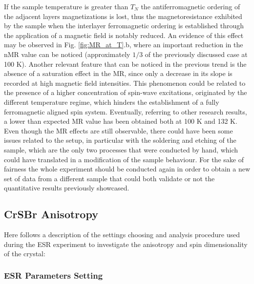 \documentclass[journal]{IEEEtran}
\begin{document}
If the sample temperature is greater than $T_N$ the antiferromagnetic ordering of the adjacent layers magnetizations is lost, thus the magnetoresistance exhibited by the sample when the interlayer ferromagnetic ordering is established through the application of a magnetic field is notably reduced. An evidence of this effect may be observed in Fig. \ref{fig:MR_at_T}.b, where an important reduction in the nMR value can be noticed (approximately $1/3$ of the previously discussed case at 100 K). Another relevant feature that can be noticed in the previous trend is the absence of a saturation effect in the MR, since only a decrease in its slope is recorded at high magnetic field intensities. This phenomenon could be related to the presence of a higher concentration of spin-wave excitations, originated by the different temperature regime, which hinders the establishment of a fully ferromagnetic aligned spin system. Eventually, referring to other research results, a lower than expected MR value has been obtained both at 100 K and 132 K. Even though the MR effects are still observable, there could have been some issues related to the setup, in particular with the soldering and etching of the sample, which are the only two processes that were conducted by hand, which could have translated in a modification of the sample behaviour. For the sake of fairness the whole experiment should be conducted again in order to obtain a new set of data from a different sample that could both validate or not the quantitative results previously showcased.

\subsection{CrSBr Anisotropy}

Here follows a description of the settings choosing and analysis procedure used during the ESR experiment to investigate the anisotropy and spin dimensionality of the crystal:

\subsubsection{ESR Parameters Setting}
\end{document}
